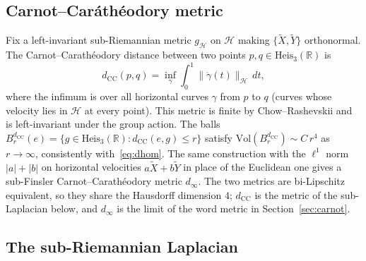 \documentclass[11pt,a4paper]{article}
\theoremstyle{definition}
\theoremstyle{remark}
\newcommand{\HeisR}{\mathrm{Heis}_3(\mathbb{R})}
\newcommand{\dCC}{d_{\mathrm{CC}}}
\begin{document}
  \subsection{Carnot--Car\'{a}th\'{e}odory metric}

    Fix a left-invariant sub-Riemannian metric $g_{\mathcal{H}}$ on $\mathcal{H}$ making
    $\{\tilde X, \tilde Y\}$ orthonormal.
    The Carnot--Car\-a\-th\'{e}o\-do\-ry distance between two points $p, q \in \HeisR$ is
    \begin{equation}
      \dCC(p,q) = \inf_\gamma \int_0^1 \|\dot\gamma(t)\|_{\mathcal{H}}\,dt,
    \end{equation}
    where the infimum is over all horizontal curves $\gamma$ from $p$ to $q$
    (curves whose velocity lies in $\mathcal{H}$ at every point).
    This metric is finite by Chow--Rashevskii and is left-invariant under the group action.
    The balls $B_r^{\dCC}(e) = \{g \in \HeisR : \dCC(e,g) \leq r\}$ satisfy
    $\mathrm{Vol}(B_r^{\dCC}) \sim C\,r^4$ as $r \to \infty$, consistently with~\eqref{eq:dhom}.
    The same construction with the $\ell^1$ norm $|a| + |b|$ on horizontal velocities $a\tilde X + b\tilde Y$ in
    place of the Euclidean one gives a sub-Finsler Carnot--Carath\'eodory metric $d_\infty$.
    The two metrics are bi-Lipschitz equivalent, so they share the Hausdorff dimension $4$; $\dCC$ is the metric of
    the sub-Laplacian below, and $d_\infty$ is the limit of the word metric in Section~\ref{sec:carnot}.

  \subsection{The sub-Riemannian Laplacian}
\end{document}
